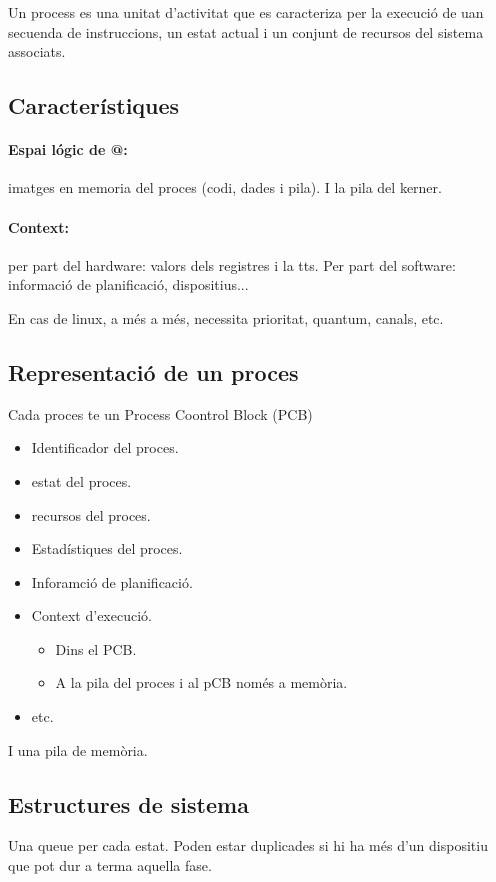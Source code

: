 \documentclass{article}
\begin{document}
    Un process es una unitat d'activitat que es caracteriza per la execució de uan secuenda de instruccions, un estat actual i un conjunt de recursos del sistema associats.

    \subsection{Característiques}

    \paragraph{Espai lógic de @: } imatges en memoria del proces (codi, dades i pila). I la pila del kerner.

    \paragraph{Context:} per part del hardware: valors dels registres i la tts. Per part del software: informació de planificació, dispositius...

    En cas de linux, a més a més, necessita prioritat, quantum, canals, etc.

    \subsection{Representació de un proces}

    Cada proces te un Process Coontrol Block (PCB)

    \begin{itemize}
        \item Identificador del proces.
        \item estat del proces.
        \item recursos del proces.
        \item Estadístiques del proces.
        \item Inforamció de planificació.
        \item Context d'execució.
            \begin{itemize}
                \item Dins el PCB.
                \item A la pila del proces i al pCB només a memòria.
            \end{itemize}
        \item etc.
    \end{itemize}

    I una pila de memòria.

    \subsection{Estructures de sistema}

    	Una queue per cada estat. Poden estar duplicades si hi ha més d'un dispositiu que pot dur a terma aquella fase. 
\end{document}

